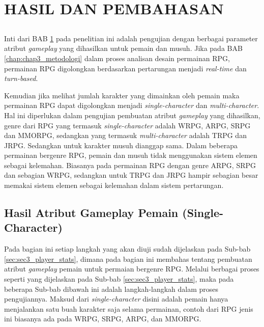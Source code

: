 \chapter{HASIL DAN PEMBAHASAN}
\label{chap:chap4_eval}
\vspace{1ex}

\section*{}
Inti dari BAB \ref{chap:chap4_eval} pada penelitian ini adalah pengujian dengan berbagai parameter atribut \textit{gameplay} yang dihasilkan untuk pemain dan musuh. Jika pada BAB \ref{chap:chap3_metodologi} dalam proses analisan desain permainan RPG, permainan RPG digolongkan berdasarkan pertarungan menjadi \textit{real-time} dan \textit{turn-based}.
\vspace{1ex}

Kemudian jika melihat jumlah karakter yang dimainkan oleh pemain maka permainan RPG dapat digolongkan menjadi \textit{single-character} dan \textit{multi-character}. Hal ini diperlukan dalam pengujian pembuatan atribut \textit{gameplay} yang dihasilkan, genre dari RPG yang termasuk \textit{single-character} adalah WRPG, ARPG, SRPG dan MMORPG, sedangkan yang termasuk \textit{multi-character} adalah TRPG dan JRPG. Sedangkan untuk karakter musuh dianggap sama. Dalam beberapa permainan bergenre RPG, pemain dan musuh tidak menggunakan sistem elemen sebagai kelemahan. Biasanya pada permainan RPG dengan genre ARPG, SRPG dan sebagian WRPG, sedangkan untuk TRPG dan JRPG hampir sebagian besar memakai sistem elemen sebagai kelemahan dalam sistem pertarungan.
\vspace{1ex}

\section{Hasil Atribut Gameplay Pemain (Single-Character)}
\label{sec:sec4_eval_single-character_player}
\vspace{1ex}

Pada bagian ini setiap langkah yang akan diuji sudah dijelaskan pada Sub-bab \ref{sec:sec3_player_stats}, dimana pada bagian ini membahas tentang pembuatan atribut \textit{gameplay} pemain untuk permaian bergenre RPG. Melalui berbagai proses seperti yang dijelaskan pada Sub-bab \ref{sec:sec3_player_stats}, maka pada beberapa Sub-bab dibawah ini adalah langkah-langkah dalam proses pengujiannya. Maksud dari \textit{single-character} disini adalah pemain hanya menjalankan satu buah karakter saja selama permainan, contoh dari RPG jenis ini biasanya ada pada WRPG, SRPG, ARPG, dan MMORPG.
\vspace{1ex}

